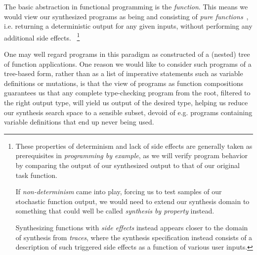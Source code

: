 \documentclass{article}
\begin{document}
The basic abstraction in functional programming is the \emph{function}.
This means we would view our synthesized programs as being and consisting of \emph{pure functions}~\citep{fortran95},
i.e. returning a deterministic output for any given inputs,
without performing any additional side effects.%
~\footnote{
    These properties of determinism and lack of side effects are generally taken as prerequisites in \emph{programming by example},
    as we will verify program behavior by comparing the output of our synthesized output to that of our original task function.

    If \emph{non-determinism} came into play,
    forcing us to test samples of our stochastic function output,
    we would need to extend our synthesis domain to something that could well be called \emph{synthesis by property} instead.

    Synthesizing functions with \emph{side effects} instead appears closer to the domain of synthesis from \emph{traces},
    where the synthesis specification instead consists of a description of such triggered side effects as a function of various user inputs.
}


One may well regard programs in this paradigm as constructed of a (nested) tree of function applications.
One reason we would like to consider such programs of a tree-based form,
rather than as a list of imperative statements such as variable definitions or mutations,
is that the view of programs as function compositions guarantees us that any complete type-checking program from the root,
filtered to the right output type,
will yield us output of the desired type,
helping us reduce our synthesis search space to a sensible subset,
devoid of e.g. programs containing variable definitions that end up never being used.
\end{document}
